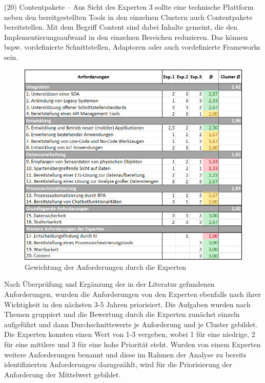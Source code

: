 (20) Contentpakete – Aus Sicht des Experten 3 sollte eine technische Plattform neben den bereitgestellten Tools in den einzelnen Clustern auch Contentpakete bereitstellen. Mit dem Begriff Content sind dabei Inhalte gemeint, die den Implementierungsaufwand in den einzelnen Bereichen reduzieren. Das können bspw. vordefinierte Schnittstellen, Adaptoren oder auch vordefinierte Frameworks sein. \autocite[Vgl.][]{SCHMIDT2023} 

\begin{figure}[h]
    \centering
    \includegraphics[width=1\textwidth]{img/Gewichtung_Anforderung.jpg}
    \caption[Gewichtung der Anforderungen durch die Experten]{Gewichtung der Anforderungen durch die Experten\autocite{Gewichtung}}
    \label{fig:Gewichtung}
\end{figure}

Nach Überprüfung und Ergänzung der in der Literatur gefundenen Anforderungen, wurden die Anforderungen von den Experten ebenfalls nach ihrer Wichtigkeit in den nächsten 3-5 Jahren priorisiert. Die Aufgaben wurden nach Themen gruppiert und die Bewertung durch die Experten zunächst einzeln aufgeführt und dann Durchschnittswerte je Anforderung und je Cluster gebildet. Die Experten konnten einen Wert von 1-3 vergeben, wobei 1 für eine niedrige, 2 für eine mittlere und 3 für eine hohe Priorität steht. Wurden von einem Experten weitere Anforderungen benannt und diese im Rahmen der Analyse zu bereits identifizierten Anforderungen dazugezählt, wird für die Priorisierung der Anforderung der Mittelwert gebildet.

